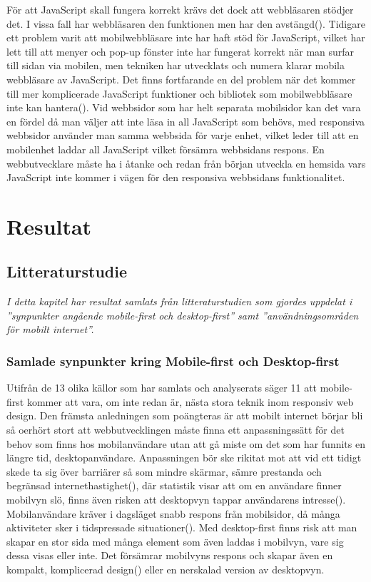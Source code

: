 \documentclass[11pt]{article}
\begin{document}
För att JavaScript skall fungera korrekt krävs det dock att webbläsaren stödjer det. I vissa fall har webbläsaren den funktionen men har den avstängd(\cite[s.13]{sara_ingmar}). Tidigare ett problem varit att mobilwebbläsare inte har haft stöd för JavaScript, vilket har lett till att menyer och pop-up fönster inte har fungerat korrekt när man surfar till sidan via mobilen, men tekniken har utvecklats och numera klarar mobila webbläsare av JavaScript. Det finns fortfarande en del problem när det kommer till mer komplicerade JavaScript funktioner och bibliotek som mobilwebbläsare inte kan hantera(\cite{quirksmode}). Vid webbsidor som har helt separata mobilsidor kan det vara en fördel då man väljer att inte läsa in all JavaScript som behövs, med responsiva webbsidor använder man samma webbsida för varje enhet, vilket leder till att en mobilenhet laddar all JavaScript vilket försämra webbsidans respons. En webbutvecklare måste ha i åtanke och redan från början utveckla en hemsida vars JavaScript inte kommer i vägen för den responsiva webbsidans funktionalitet.

\newpage

\section{Resultat}
\subsection{Litteraturstudie}
\textit{I detta kapitel har resultat samlats från litteraturstudien som gjordes uppdelat i ''synpunkter angående mobile-first och desktop-first'' samt ''användningsområden för mobilt internet''.}
\subsubsection{Samlade synpunkter kring Mobile-first och Desktop-first}
Utifrån de 13 olika källor som har samlats och analyserats säger 11 att mobile-first kommer att vara, om inte redan är, nästa stora teknik inom responsiv web design. Den främsta anledningen som poängteras är att mobilt internet börjar bli så oerhört stort att webbutvecklingen måste finna ett anpassningssätt för det behov som finns hos mobilanvändare utan att gå miste om det som har funnits en längre tid, desktopanvändare. Anpassningen bör ske rikitat mot att vid ett tidigt skede ta sig över barriärer så som mindre skärmar, sämre prestanda och begränsad internethastighet(\cite{themepartner}), där statistik visar att om en användare finner mobilvyn slö, finns även risken att desktopvyn tappar användarens intresse(\cite{zurbword}). Mobilanvändare kräver i dagsläget snabb respons från mobilsidor, då många aktiviteter sker i tidspressade situationer(\cite{techradar}). Med desktop-first finns risk att man skapar en stor sida med många element som även laddas i mobilvyn, vare sig dessa visas eller inte. Det försämrar mobilvyns respons och skapar även en kompakt, komplicerad design(\cite{zurbword}) eller en nerskalad version av desktopvyn.
\end{document}
